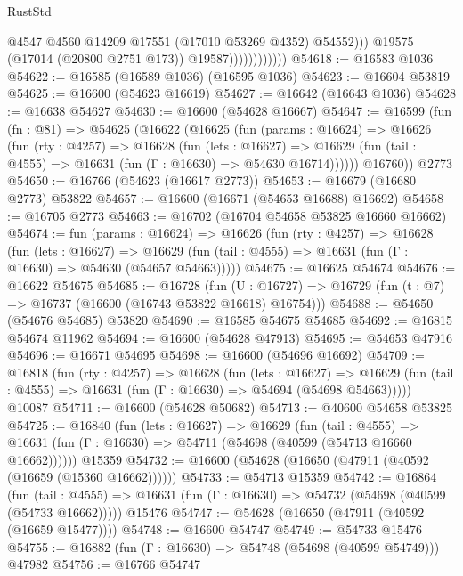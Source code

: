 \begin{lexlean}{RustStd}
\begin{coremodule}
                                  @4547
                                  @4560
                                  @14209
                                  @17551
                                  (@17010 @53269 @4352)
                                  @54552)))
                            @19575
                            (@17014 (@20800 @2751 @173))
                            @19587))))))))))))
@54618 := @16583 @1036
@54622 := @16585 (@16589 @1036) (@16595 @1036)
@54623 := @16604 @53819
@54625 := @16600 (@54623 @16619)
@54627 := @16642 (@16643 @1036)
@54628 := @16638 @54627
@54630 := @16600 (@54628 @16667)
@54647 := @16599
    (fun (fn : @81) =>
    @54625
      (@16622
        (@16625
          (fun (params : @16624) =>
          @16626
            (fun (rty : @4257) =>
            @16628
              (fun (lets : @16627) =>
              @16629 (fun (tail : @4555) => @16631 (fun (Γ : @16630) => @54630 @16714))))))
        @16760))
    @2773
@54650 := @16766 (@54623 (@16617 @2773))
@54653 := @16679 (@16680 @2773) @53822
@54657 := @16600 (@16671 (@54653 @16688) @16692)
@54658 := @16705 @2773
@54663 := @16702 (@16704 @54658 @53825 @16660 @16662)
@54674 := fun (params : @16624) =>
  @16626
    (fun (rty : @4257) =>
    @16628
      (fun (lets : @16627) =>
      @16629 (fun (tail : @4555) => @16631 (fun (Γ : @16630) => @54630 (@54657 @54663)))))
@54675 := @16625 @54674
@54676 := @16622 @54675
@54685 := @16728
    (fun (U : @16727) => @16729 (fun (t : @7) => @16737 (@16600 (@16743 @53822 @16618) @16754)))
@54688 := @54650 (@54676 @54685) @53820
@54690 := @16585 @54675 @54685
@54692 := @16815 @54674 @11962
@54694 := @16600 (@54628 @47913)
@54695 := @54653 @47916
@54696 := @16671 @54695
@54698 := @16600 (@54696 @16692)
@54709 := @16818
    (fun (rty : @4257) =>
    @16628
      (fun (lets : @16627) =>
      @16629 (fun (tail : @4555) => @16631 (fun (Γ : @16630) => @54694 (@54698 @54663)))))
    @10087
@54711 := @16600 (@54628 @50682)
@54713 := @40600 @54658 @53825
@54725 := @16840
    (fun (lets : @16627) =>
    @16629
      (fun (tail : @4555) =>
      @16631 (fun (Γ : @16630) => @54711 (@54698 (@40599 (@54713 @16660 @16662))))))
    @15359
@54732 := @16600 (@54628 (@16650 (@47911 (@40592 (@16659 (@15360 @16662))))))
@54733 := @54713 @15359
@54742 := @16864
    (fun (tail : @4555) => @16631 (fun (Γ : @16630) => @54732 (@54698 (@40599 (@54733 @16662)))))
    @15476
@54747 := @54628 (@16650 (@47911 (@40592 (@16659 @15477))))
@54748 := @16600 @54747
@54749 := @54733 @15476
@54755 := @16882 (fun (Γ : @16630) => @54748 (@54698 (@40599 @54749))) @47982
@54756 := @16766 @54747

\end{coremodule}
\end{lexlean}
